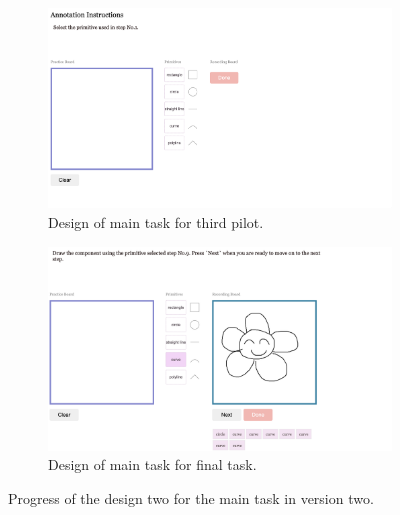 \begin{figure}[ht!]
\begin{subfigure}{\textwidth}
  \centering
  \includegraphics[width=.8\linewidth]{data_collection/version_0_select_primitive.png}
  \caption{Design of main task for third pilot.}
  \label{v0.1}
\end{subfigure}
\newline
\begin{subfigure}{\textwidth}
  \centering
  \includegraphics[width=.8\linewidth]{data_collection/version_0_smiley_flower_with_primitive.png}  
  \caption{Design of main task for final task.}
  \label{v0.2}
\end{subfigure}
\caption{Progress of the design two for the main task in version two.}
\label{v0.design}
\end{figure}